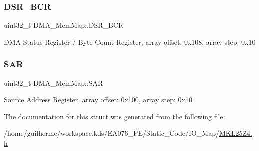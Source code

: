 \subsubsection{\texorpdfstring{D\+S\+R\+\_\+\+B\+CR}{DSR\_BCR}}
{\footnotesize\ttfamily uint32\+\_\+t D\+M\+A\+\_\+\+Mem\+Map\+::\+D\+S\+R\+\_\+\+B\+CR}

D\+MA Status Register / Byte Count Register, array offset\+: 0x108, array step\+: 0x10 \mbox{\label{struct_d_m_a___mem_map_a800d089db050cc5c5376f4fd1b8607f4}} 
\subsubsection{\texorpdfstring{S\+AR}{SAR}}
{\footnotesize\ttfamily uint32\+\_\+t D\+M\+A\+\_\+\+Mem\+Map\+::\+S\+AR}

Source Address Register, array offset\+: 0x100, array step\+: 0x10 

The documentation for this struct was generated from the following file\+:\begin{DoxyCompactItemize}
\item 
/home/guilherme/workspace.\+kds/\+E\+A076\+\_\+\+P\+E/\+Static\+\_\+\+Code/\+I\+O\+\_\+\+Map/\hyperlink{_m_k_l25_z4_8h}{M\+K\+L25\+Z4.\+h}\end{DoxyCompactItemize}
